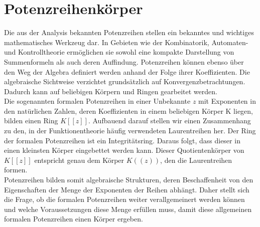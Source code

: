 \chapter{Potenzreihenkörper}\label{chap3}
%
Die aus der Analysis bekannten Potenzreihen stellen ein bekanntes und wichtiges mathematisches Werkzeug dar. In Gebieten wie der Kombinatorik, Automaten- und Kontrolltheorie ermöglichen sie sowohl eine kompakte Darstellung von Summenformeln als auch deren Auffindung. Potenzreihen können ebenso über den Weg der Algebra definiert werden anhand der Folge ihrer Koeffizienten. Die algebraische Sichtweise verzichtet grundsätzlich auf Konvergenzbetrachtungen. Dadurch kann auf beliebigen Körpern und Ringen gearbeitet werden. \\
Die sogenannten formalen Potenzreihen in einer Unbekannte $z$ mit Exponenten in den natürlichen Zahlen, deren Koeffizienten in einem beliebigen Körper K liegen, bilden einen Ring $K[[z]]$. Aufbauend darauf stellen wir einen Zusammenhang zu den, in der Funktionentheorie häufig verwendeten Laurentreihen her. Der Ring der formalen Potenzreihen ist ein Integritätsring. Daraus folgt, dass dieser in einen kleinsten Körper eingebettet werden kann. Dieser Quotientenkörper von $K[[z]]$ entspricht genau dem Körper $K((z))$, den die Laurentreihen formen. \\
Potenzreihen bilden somit algebraische Strukturen, deren Beschaffenheit von den Eigenschaften der Menge der Exponenten der Reihen abhängt. Daher stellt sich die Frage, ob die formalen Potenzreihen weiter verallgemeinert werden können und welche Voraussetzungen diese Menge erfüllen muss, damit diese allgemeinen formalen Potenzreihen einen Körper ergeben. %

